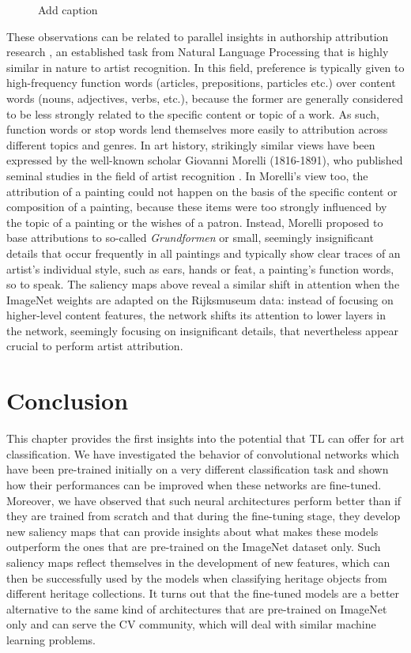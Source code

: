 \begin{figure}[!htb]
\endminipage

\caption{Add caption}
\label{fig:saliency_maps}
\end{figure}


These observations can be related to parallel insights in authorship attribution research \cite{stamatatos:2009}, an established task from Natural Language Processing that is highly similar in nature to artist recognition. In this field, preference is typically given to high-frequency function words (articles, prepositions, particles etc.) over content words (nouns, adjectives, verbs, etc.), because the former are generally considered to be less strongly related to the specific content or topic of a work. As such, function words or stop words lend themselves more easily to attribution across different topics and genres. In art history, strikingly similar views have been expressed by the well-known scholar Giovanni Morelli (1816-1891), who published seminal studies in the field of artist recognition \cite{wollheim:1972}. In Morelli's view too, the attribution of a painting could not happen on the basis of the specific content or composition of a painting, because these items were too strongly influenced by the topic of a painting or the wishes of a patron. Instead, Morelli proposed to base attributions to so-called \emph{Grundformen} or small, seemingly insignificant details that occur frequently in all paintings and typically show clear traces of an artist's individual style, such as ears, hands or feat, a painting's function words, so to speak. The saliency maps above reveal a similar shift in attention when the ImageNet weights are adapted on the Rijksmuseum data: instead of focusing on higher-level content features, the network shifts its attention to lower layers in the network, seemingly focusing on insignificant details, that nevertheless appear crucial to perform artist attribution.


\section{Conclusion} 
\label{sec:ch_4_conclusion}
 
This chapter provides the first insights into the potential that TL can offer for art classification. We have investigated the behavior of convolutional networks which have been pre-trained initially on a very different classification task and shown how their performances can be improved when these networks are fine-tuned. Moreover, we have observed that such neural architectures perform better than if they are trained from scratch and that during the fine-tuning stage, they develop new saliency maps that can provide insights about what makes these models outperform the ones that are pre-trained on the ImageNet dataset only. Such saliency maps reflect themselves in the development of new features, which can then be successfully used by the models when classifying heritage objects from different heritage collections. It turns out that the fine-tuned models are a better alternative to the same kind of architectures that are pre-trained on ImageNet only and can serve the CV community, which will deal with similar machine learning problems.

